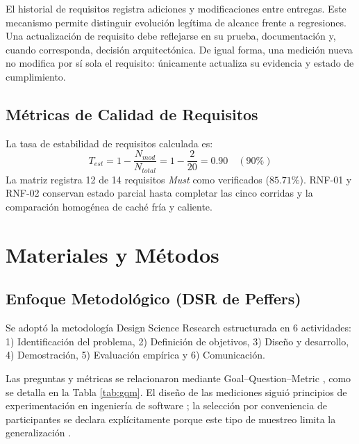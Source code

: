 \documentclass[11pt,a4paper]{report}
\begin{document}
El historial de requisitos registra adiciones y modificaciones entre entregas. Este mecanismo permite distinguir evolución legítima de alcance frente a regresiones. Una actualización de requisito debe reflejarse en su prueba, documentación y, cuando corresponda, decisión arquitectónica. De igual forma, una medición nueva no modifica por sí sola el requisito: únicamente actualiza su evidencia y estado de cumplimiento.

\section{Métricas de Calidad de Requisitos}
La tasa de estabilidad de requisitos calculada es:
\begin{equation}
    T_{est} = 1 - \frac{N_{mod}}{N_{total}} = 1 - \frac{2}{20} = 0.90 \quad (90\%)
\end{equation}
La matriz registra 12 de 14 requisitos \emph{Must} como verificados ($85.71\%$). RNF-01 y RNF-02 conservan estado parcial hasta completar las cinco corridas y la comparación homogénea de caché fría y caliente.

\chapter{Materiales y Métodos}
\section{Enfoque Metodológico (DSR de Peffers)}
Se adoptó la metodología Design Science Research \cite{peffers2007design, hevner2004design} estructurada en 6 actividades:
1) Identificación del problema, 2) Definición de objetivos, 3) Diseño y desarrollo, 4) Demostración, 5) Evaluación empírica y 6) Comunicación.

Las preguntas y métricas se relacionaron mediante Goal--Question--Metric \cite{basili1994gqm}, como se detalla en la Tabla \ref{tab:gqm}. El diseño de las mediciones siguió principios de experimentación en ingeniería de software \cite{wohlin2012experimentation}; la selección por conveniencia de participantes se declara explícitamente porque este tipo de muestreo limita la generalización \cite{baltes2022sampling}.
\end{document}
